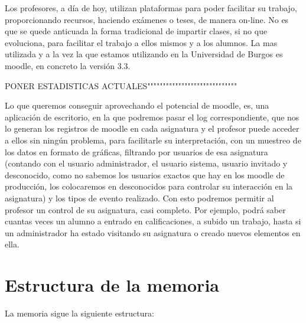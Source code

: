 
Los profesores, a día de hoy, utilizan plataformas para poder facilitar su trabajo, proporcionando recursos, haciendo exámenes o teses, de manera on-line. No es que se quede anticuada la forma tradicional de impartir clases, si no que evoluciona, para facilitar el trabajo a ellos mismos y a los alumnos.
La mas utilizada y a la vez la que estamos utilizando en la Universidad de Burgos es moodle, en concreto la versión 3.3.

PONER ESTADISTICAS ACTUALES"""""""""""""""""""""""""""""

Lo que queremos conseguir aprovechando el potencial de moodle, es, una aplicación de escritorio, en la que podremos pasar el log correspondiente, que nos lo generan los registros de moodle en cada asignatura y el profesor puede acceder a ellos sin ningún problema, para facilitarle su interpretación, con un muestreo de los datos en formato de gráficas, filtrando por usuarios de esa asignatura (contando con el usuario administrador, el usuario sistema, usuario invitado y desconocido, como no sabemos los usuarios exactos que hay en los moodle de producción, los colocaremos en desconocidos para controlar su interacción en la asignatura) y los tipos de evento realizado. 
Con esto podremos permitir al profesor un control de su asignatura, casi completo. Por ejemplo, podrá saber cuantas veces un alumno a entrado en calificaciones, a subido un trabajo, hasta si un administrador ha estado visitando su asignatura o creado nuevos elementos en ella.

\section{Estructura de la memoria}\label{estructura-de-la-memoria}

La memoria sigue la siguiente estructura:

